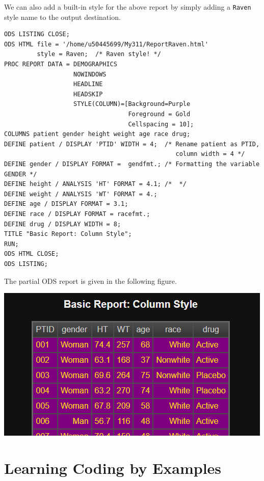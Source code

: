 \documentclass[
]{book}
\begin{document}
We can also add a built-in style for the above report by simply adding a \texttt{Raven} style name to the output destination.

\begin{verbatim}
ODS LISTING CLOSE;
ODS HTML file = '/home/u50445699/My311/ReportRaven.html'
         style = Raven;  /* Raven style! */
PROC REPORT DATA = DEMOGRAPHICS
                   NOWINDOWS
                   HEADLINE
                   HEADSKIP
                   STYLE(COLUMN)=[Background=Purple 
                                  Foreground = Gold 
                                  Cellspacing = 10];
COLUMNS patient gender height weight age race drug;
DEFINE patient / DISPLAY 'PTID' WIDTH = 4;  /* Rename patient as PTID, 
                                               column width = 4 */
DEFINE gender / DISPLAY FORMAT =  gendfmt.; /* Formatting the variable GENDER */
DEFINE height / ANALYSIS 'HT' FORMAT = 4.1; /*  */
DEFINE weight / ANALYSIS 'WT' FORMAT = 4.;
DEFINE age / DISPLAY FORMAT = 3.1;
DEFINE race / DISPLAY FORMAT = racefmt.;
DEFINE drug / DISPLAY WIDTH = 8;
TITLE "Basic Report: Column Style";
RUN;
ODS HTML CLOSE;
ODS LISTING;
\end{verbatim}

The partial ODS report is given in the following figure.

\begin{center}\includegraphics[width=1\linewidth]{img13/w13-odsRavenReport} \end{center}

\hypertarget{learning-coding-by-examples-9}{%
\section{Learning Coding by Examples}\label{learning-coding-by-examples-9}}
\end{document}
